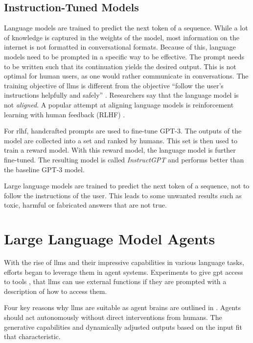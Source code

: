 \documentclass[../main.tex]{subfiles}
\begin{document}
\subsection{Instruction-Tuned Models}

Language models are trained to predict the next token of a sequence.
While a lot of knowledge is captured in the weights of the model,
most information on the internet is not formatted in conversational formats. %
Because of this, language models need to be prompted in a specific way to be effective.
The prompt needs to be written such that its continuation yields the desired output.
This is not optimal for human users, as one would rather communicate in conversations.
The training objective of \glspl{llm} is different from the objective
``follow the user's instructions helpfully and safely'' \cite{Ouyang2022}.
Researchers say that the language model is not \emph{aligned}.
A popular attempt at aligning language models is reinforcement learning with human feedback (RLHF) \cite{Ouyang2022}.

For \gls{rlhf}, handcrafted prompts are used to fine-tune GPT-3.
The outputs of the model are collected into a set and ranked by humans.
This set is then used to train a reward model.
With this reward model, the language model is further fine-tuned.
The resulting model is called \emph{InstructGPT} and performs better than the baseline GPT-3 model.

Large language models are trained to predict the next token of a sequence,
not to follow the instructions of the user.
This leads to some unwanted results such as toxic, harmful or fabricated answers that are not true.

\section{Large Language Model Agents}
\label{sec:llm_agents}
With the rise of \glspl{llm} and their impressive capabilities in various language tasks,
efforts began to leverage them in agent systems.
Experiments to give \gls{gpt} access to tools \autocite{Shen2023, Schick2023},
that \glspl{llm} can use external functions
if they are prompted with a description of how to access them.

Four key reasons why \glspl{llm} are suitable as agent brains are outlined in \cite{Xi2023}.
Agents should act autonomously without direct interventions from humans.
The generative capabilities and dynamically adjusted outputs based on the input fit that characteristic.
\end{document}
